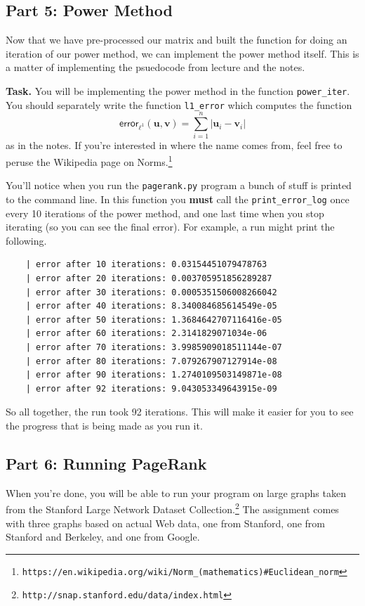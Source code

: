 \documentclass{article}
\theoremstyle{remark}
\newcommand{\vv}[1]{\mathbf{#1}}
\begin{document}
\subsection*{Part 5: Power Method}

Now that we have pre-processed our matrix and built the function for doing an iteration of our power method, we can implement the power method itself.
This is a matter of implementing the psuedocode from lecture and the notes.

\smallskip
\noindent
\textbf{Task.}
You will be implementing the power method in the function \texttt{power\_iter}.
You should separately write the function \texttt{l1\_error} which computes the function
\begin{displaymath}
  \mathsf{error}_{\ell^1}(\vv u, \vv v) = \sum_{i = 1}^n |\vv u_i - \vv v_i|
\end{displaymath}
as in the notes.
If you're interested in where the name comes from, feel free to peruse the Wikipedia page on Norms.\footnote{\texttt{https://en.wikipedia.org/wiki/Norm\_(mathematics)\#Euclidean\_norm}}

You'll notice when you run the \texttt{pagerank.py} program a bunch of stuff is printed to the command line.
In this function you \textbf{must} call the \texttt{print\_error\_log} once every 10 iterations of the power method, and one last time when you stop iterating (so you can see the final error).
For example, a run might print the following.
\begin{lstlisting}
    | error after 10 iterations: 0.03154451079478763
    | error after 20 iterations: 0.003705951856289287
    | error after 30 iterations: 0.0005351506008266042
    | error after 40 iterations: 8.340084685614549e-05
    | error after 50 iterations: 1.3684642707116416e-05
    | error after 60 iterations: 2.3141829071034e-06
    | error after 70 iterations: 3.9985909018511144e-07
    | error after 80 iterations: 7.079267907127914e-08
    | error after 90 iterations: 1.2740109503149871e-08
    | error after 92 iterations: 9.043053349643915e-09
\end{lstlisting}
So all together, the run took 92 iterations.
This will make it easier for you to see the progress that is being made as you run it.

\subsection*{Part 6: Running PageRank}

When you're done, you will be able to run your program on large graphs taken from the Stanford Large Network Dataset Collection.\footnote{\texttt{http://snap.stanford.edu/data/index.html}}
The assignment comes with three graphs based on actual Web data, one from Stanford, one from Stanford and Berkeley, and one from Google.
\end{document}
